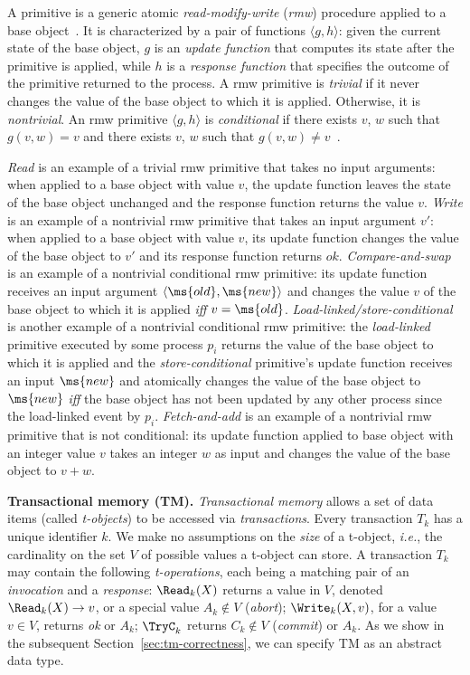 A primitive is a generic atomic \emph{read-modify-write} (\emph{rmw}) procedure applied to a base object~\cite{G05,Her91}.
It is characterized by a pair of functions $\langle g,h \rangle$:
given the current state of the base object, $g$ is an \emph{update function} that
computes its state after the primitive is applied, while $h$ 
is a \emph{response function} that specifies the outcome of the primitive returned to the process.
A rmw primitive is \emph{trivial} if it never changes the value of the base object to which it is applied.
Otherwise, it is \emph{nontrivial}.
An rmw primitive $\langle g,h \rangle$ is \emph{conditional} if there exists $v$, $w$ such that
$g(v,w)=v$ and there exists $v$, $w$ such that
$g(v,w)\neq v$~\cite{cond-04}.

\emph{Read} is an example of a trivial rmw primitive that takes no input arguments: when applied
to a base object with value $v$, the update function leaves the state of the base object unchanged and 
the response function returns the value $v$.
\emph{Write} is an example of a nontrivial rmw primitive that takes an input argument $v'$: when applied to a base object
with value $v$, its update function changes the value of the base object to $v'$ and its response function
returns $ok$.
\emph{Compare-and-swap} is an example of a nontrivial conditional rmw primitive: its update function receives an input argument 
$\langle \ms{old},\ms{new} \rangle$ and changes the value $v$ of the base object to which it is applied \emph{iff} $v=\ms{old}$.
\emph{Load-linked/store-conditional} is another example of a nontrivial conditional rmw primitive:
the \emph{load-linked} primitive executed by some process $p_i$ returns the value of the base object to which
it is applied and the \emph{store-conditional} primitive's update function receives an input $\ms{new}$ and 
atomically changes the value of the base object to $\ms{new}$
\emph{iff} the base object has not been updated by any other process since the load-linked event by $p_i$.
\emph{Fetch-and-add} is an example of a nontrivial rmw primitive that is not conditional: its update
function applied to base object with an integer value $v$ takes an integer $w$ as input
and changes the value of the base object to $v+w$.

\vspace{1mm}\noindent\textbf{Transactional memory (TM).}
\emph{Transactional memory}
allows a set of data items (called \emph{t-objects}) to be accessed 
via \emph{transactions}.
Every transaction $T_k$ has a unique identifier $k$. 
We make no assumptions on the \emph{size} of a t-object, \emph{i.e.}, 
the cardinality on the set $V$ of possible values a t-object can store.
A transaction $T_k$ may contain the following \emph{t-operations},
each being a matching pair of an \emph{invocation} and a \emph{response}:
$\Read_k(X)$ returns a value in $V$, denoted $\Read_k(X) \rightarrow v$, 
or a special value $A_k\notin V$ (\emph{abort});
$\Write_k(X,v)$, for a value $v \in V$,
returns \textit{ok} or $A_k$;
$\TryC_k$ returns $C_k\notin V$ (\emph{commit}) or $A_k$.
As we show in the subsequent Section~\ref{sec:tm-correctness}, we can specify
TM as an abstract data type.

